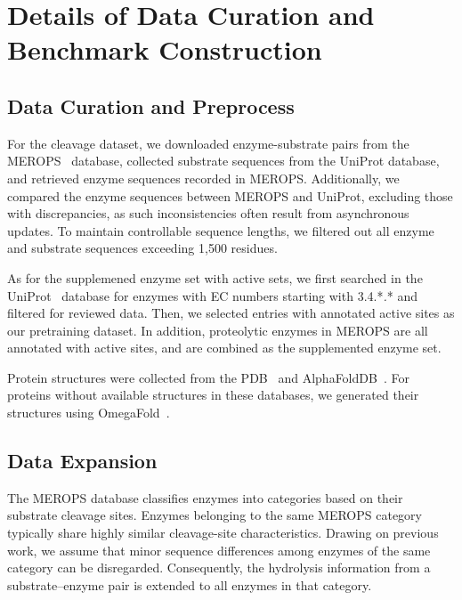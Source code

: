 \appendix


\section{Details of Data Curation and Benchmark Construction}
\label{sec:app_dataset} 


\subsection{Data Curation and Preprocess}


For the cleavage dataset, we downloaded enzyme-substrate pairs from the MEROPS~\cite{Merops} database, collected substrate sequences from the UniProt database, and retrieved enzyme sequences recorded in MEROPS. Additionally, we compared the enzyme sequences between MEROPS and UniProt, excluding those with discrepancies, as such inconsistencies often result from asynchronous updates. To maintain controllable sequence lengths, we filtered out all enzyme and substrate sequences exceeding 1{,}500 residues. 

As for the supplemened enzyme set with active sets, we first searched in the UniProt~\cite{Uniprot} database for enzymes with EC numbers starting with 3.4.*\textit{.}* and filtered for reviewed data. Then, we selected entries with annotated active sites as our pretraining dataset. In addition, proteolytic  enzymes in MEROPS are all annotated with active sites, and are combined as the supplemented enzyme set.

Protein structures were collected from the PDB~\cite{PDB} and AlphaFoldDB~\cite{AlphaFoldDB}. For proteins without available structures in these databases, we generated their structures using OmegaFold~\cite{OmegaFold}.

\subsection{Data Expansion}
The MEROPS database classifies enzymes into categories based on their substrate cleavage sites. Enzymes belonging to the same MEROPS category typically share highly similar cleavage-site characteristics\cite{Merops}. Drawing on previous work, we assume that minor sequence differences among enzymes of the same category can be disregarded. Consequently, the hydrolysis information from a substrate–enzyme pair is extended to all enzymes in that category.

